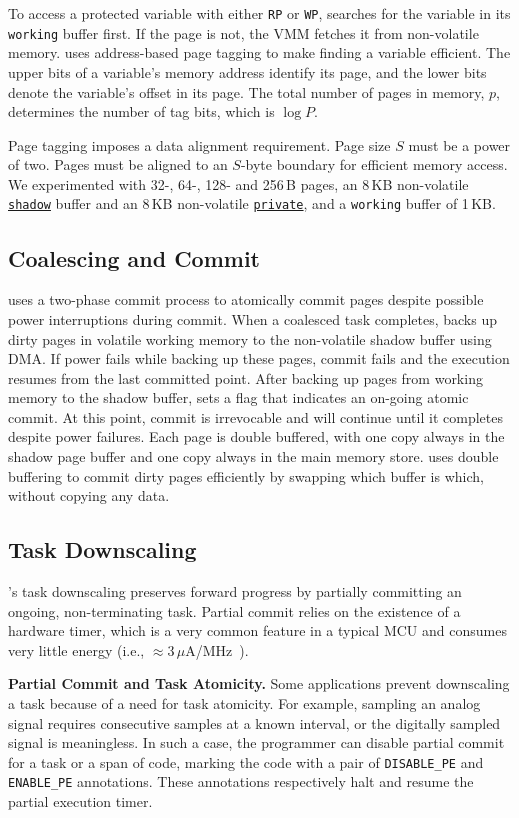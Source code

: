 To access a protected variable with either \texttt{RP}
or \texttt{WP}, \sys searches for the variable in its \texttt{working} buffer first.
 If the page is not, the VMM fetches it from non-volatile memory. 
%
\sys uses address-based page tagging to make finding a variable efficient.  The
upper bits of a variable's memory address identify its page, and the lower bits
denote the variable's offset in its page. The total number of pages in memory,
$p$, determines the number of tag bits, which is $\log P$.

Page tagging imposes a data alignment requirement.
Page size $S$ must be a power of two. 
%
Pages must be aligned to an $S$-byte boundary for efficient memory access. 
%
We experimented with 32-, 64-, 128- and 256\,B pages, an 8\,KB non-volatile \texttt{\underline{shadow}} buffer and
an 8\,KB non-volatile \texttt{\underline{private}}, and a \texttt{working} buffer
of 1\,KB.
%
\subsection{Coalescing and Commit}
%
\sys uses a two-phase commit process to atomically commit pages despite
possible power interruptions during commit.  When a coalesced task completes,
\sys backs up dirty pages in volatile working memory to the non-volatile
shadow buffer using DMA. 
%
If power fails while backing up these pages, commit fails and the execution
resumes from the last committed point.  After backing up pages from working
memory to the shadow buffer, \sys sets a flag that indicates an on-going atomic
commit.  At this point, commit is irrevocable and will continue until it
completes despite power failures.   
%
Each page is double buffered, with one copy always in the shadow page buffer
and one copy always in the main memory store.  \sys uses double buffering to
commit dirty pages efficiently by swapping which buffer is which, without
copying any data.
%
\subsection{Task Downscaling}
%
\sys's task downscaling preserves forward progress by partially committing an
ongoing, non-terminating task. 
%
Partial commit relies on the existence of a hardware timer, which is a very
common feature in a typical MCU and consumes very little energy (i.e.,
$\approx$3\,$\mu$A/MHz~\cite{msp430datasheet}).  

 \textbf{Partial Commit and Task Atomicity.} Some applications prevent
downscaling a task because of a need for task atomicity.  For example, sampling
an analog signal requires consecutive samples at a known interval, or the
digitally sampled signal is meaningless.  In such a case, the programmer can
disable partial commit for a task or a span of code, marking  the code with a
pair of \texttt{DISABLE\_PE} and \texttt{ENABLE\_PE} annotations.
These annotations respectively halt and resume the partial execution timer.